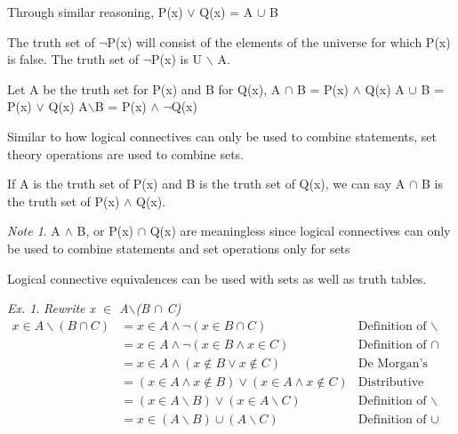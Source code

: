 \documentclass[11pt]{article}
\theoremstyle{definition}
\theoremstyle{remark}
\newtheorem{exer}{Ex.}
\newtheorem{note}{Note}
\begin{document}
Through similar reasoning, P(x) $\lor$ Q(x) = A $\cup$ B

The truth set of $\neg$P(x) will consist of the elements of the universe for which P(x) is false.
The truth set of $\neg$P(x) is U $\backslash$ A.

\begin{shaded}
    Let A be the truth set for P(x) and B for Q(x),\newline
    A $\cap$ B = P(x) $\land$ Q(x)\newline
    A $\cup$ B = P(x) $\lor$ Q(x)\newline
    A$\backslash$B = P(x) $\land$ $\neg$Q(x)
\end{shaded}

Similar to how logical connectives can only be used to combine statements, set theory operations
are used to combine sets.

If A is the truth set of P(x) and B is the truth set of Q(x), we can say A $\cap$ B is the truth set
of P(x) $\land$ Q(x).

\begin{note}
    A $\land$ B, or P(x) $\cap$ Q(x) are meaningless since logical connectives can only be used to combine statements
    and set operations only for sets
\end{note}

Logical connective equivalences can be used with sets as well as truth tables.

\begin{exer} \textit{Rewrite x $\in$ A$\backslash$(B $\cap$ C)} \newline 
\begin{align*}
    x \in A \backslash (B \cap C) &=x \in A \land \neg(x \in B \cap C) &\text{Definition of $\backslash$  }\\
    &=x \in A \land \neg(x \in B \land x \in C) &\text{Definition of $\cap$ }\\
    &=x \in A \land (x \notin B \lor x \notin C) & \text{De Morgan's Law}\\
    &=(x \in A \land x \notin B) \lor (x \in A \land x \notin C) &\text{Distributive Law}\\
    &=(x \in A\backslash B) \lor (x \in A\backslash C) &\text{Definition of $\backslash$ }\\
    &=x \in (A \backslash B) \cup (A \backslash C) &\text{Definition of $\cup$ }
\end{align*}
\end{exer} 
\end{document}
